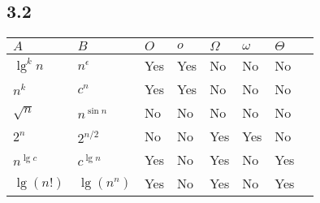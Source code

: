 \subsection{3.2}
	\begin{tabular}{ll|l|l|l|l|l|l|}
		$A$			&	$B$			&	$O$	&$o$	&$\Omega$&$\omega$&$\Theta$ \\ 	\hline
		$\lg^k n$	&	$n^\epsilon$&Yes	&Yes	&No		&No		&No		\\ 	\hline
		$n^k$		&	$c^n$		&Yes	&Yes	&No		&No		&No		\\ 	\hline
		$\sqrt{n}$	&	$n^{\sin n}$&No		&No		&No		&No		&No		\\ 	\hline
		$2^n$		&	$2^{n/2}$	&No		&No		&Yes	&Yes	&No		\\	\hline
		$n^{\lg c}$	&	$c^{\lg n}$	&Yes	&No		&Yes	&No		&Yes	\\	\hline
		$\lg (n!)$	&	$\lg(n^n)$	&Yes	&No		&Yes	&No		&Yes	\\	\hline
	\end{tabular}
